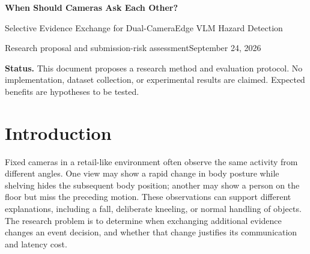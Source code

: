 \documentclass[10pt,a4paper]{article}
\newcommand{\note}[1]{\par\smallskip\noindent\colorbox{pale}{\parbox{\dimexpr\linewidth-2\fboxsep\relax}{#1}}\par\smallskip}
\begin{document}
\thispagestyle{empty}
{\Large\bfseries\color{ink} When Should Cameras Ask Each Other?\par}
\vspace{4pt}
{\large Selective Evidence Exchange for Dual-Camera\newline Edge VLM Hazard Detection\par}
\vspace{7pt}
{\small Research proposal and submission-risk assessment\hfill September 24, 2026\par}
\vspace{5pt}
\note{\small\textbf{Status.} This document proposes a research method and evaluation protocol. No implementation, dataset collection, or experimental results are claimed. Expected benefits are hypotheses to be tested.}

\begin{abstract}
Two cameras observing the same scene can expose complementary evidence of a hazardous event, yet continuous transmission of both video streams may be costly on edge devices. Independent alarms exploit view redundancy but do not necessarily combine evidence that is insufficient in either view alone. We propose to investigate selective, auditable evidence exchange between two locally deployed vision-language models (VLMs). Each device maintains a video buffer and structured observations, requests peer evidence when visibility or event evidence is inadequate, and verifies the event using time-aligned visual observations. The proposed policy explicitly considers confident false negatives, communication budgets, and response deadlines. Evaluation separates single-view-sufficient events from events judged to require both views, and compares against alarm-only fusion, budget-matched periodic exchange, local re-inference, and a centralized dual-view VLM. The main hypothesis is that evidence-aware requests improve deadline-constrained event recall at a fixed false-alarm allowance and communication budget. The proposal also identifies conditions under which this hypothesis would fail and the evidence required for a defensible paper submission.
\end{abstract}

\section{Introduction}
Fixed cameras in a retail-like environment often observe the same activity from different angles. One view may show a rapid change in body posture while shelving hides the subsequent body position; another may show a person on the floor but miss the preceding motion. These observations can support different explanations, including a fall, deliberate kneeling, or normal handling of objects. The research problem is to determine when exchanging additional evidence changes an event decision, and whether that change justifies its communication and latency cost.
\end{document}
